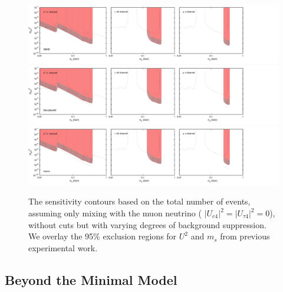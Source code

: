 \documentclass[11pt, a4paper]{article}
\begin{document}
\begin{figure}[t]
\center
\includegraphics[width=1.0\textwidth,clip,trim=0 20 300 15]{figures/sbnd_all_panels_um4.pdf}
\includegraphics[width=1.0\textwidth,clip,trim=0 20 300 15]{figures/muboone_all_panels_um4.pdf}
\includegraphics[width=1.0\textwidth,clip,trim=0 20 300 15]{figures/icarus_all_panels_um4.pdf}

\caption{\label{fig:no_cuts_scaled_bkg_um4_only}The sensitivity contours based on the total
number of events, assuming only mixing with the muon neutrino ( $\vert U_{e 4}\vert^2=\vert U_{\tau 4}\vert^2=0$), without cuts but with varying degrees of background
suppression. We overlay the 95\% exclusion regions for $U^2$ and $m_s$ from
previous experimental work.}

\end{figure}



\subsection{Beyond the Minimal Model}
\end{document}
